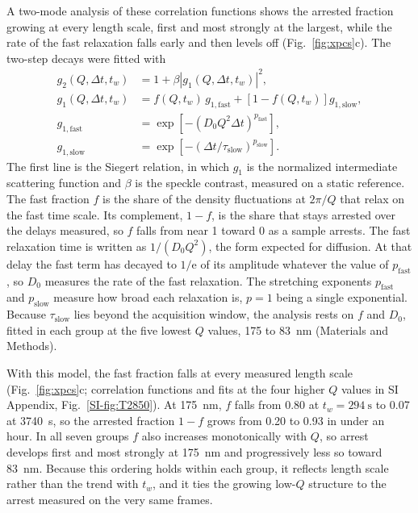 \documentclass[journal=nalefd,manuscript=letter,layout=traditional]{achemso}
\begin{document}
A two-mode analysis of these correlation functions shows the arrested fraction growing at every length scale, first and most strongly at the largest, while the rate of the fast relaxation falls early and then levels off (Fig.~\ref{fig:xpcs}c). The two-step decays were fitted with
\begin{equation}
\begin{aligned}
 g_2(Q,\Delta t,t_w)&=1+\beta\left|g_1(Q,\Delta t,t_w)\right|^{2},\\
 g_1(Q,\Delta t,t_w)&=f(Q,t_w)\,g_{1,\mathrm{fast}}+\left[1-f(Q,t_w)\right]g_{1,\mathrm{slow}},\\
 g_{1,\mathrm{fast}}&=\exp\!\left[-\left(D_0Q^{2}\Delta t\right)^{p_{\mathrm{fast}}}\right],\\
 g_{1,\mathrm{slow}}&=\exp\!\left[-\left(\Delta t/\tau_{\mathrm{slow}}\right)^{p_{\mathrm{slow}}}\right].
\end{aligned}
 \label{eq:twomode}
\end{equation}
The first line is the Siegert relation, in which $g_1$ is the normalized intermediate scattering function and $\beta$ is the speckle contrast, measured on a static reference. The fast fraction $f$ is the share of the density fluctuations at $2\pi/Q$ that relax on the fast time scale. Its complement, $1-f$, is the share that stays arrested over the delays measured, so $f$ falls from near 1 toward 0 as a sample arrests. The fast relaxation time is written as $1/(D_0Q^2)$, the form expected for diffusion. At that delay the fast term has decayed to $1/\mathrm{e}$ of its amplitude whatever the value of $p_{\mathrm{fast}}$, so $D_0$ measures the rate of the fast relaxation. The stretching exponents $p_{\mathrm{fast}}$ and $p_{\mathrm{slow}}$ measure how broad each relaxation is, $p=1$ being a single exponential. Because $\tau_{\mathrm{slow}}$ lies beyond the acquisition window, the analysis rests on $f$ and $D_0$, fitted in each group at the five lowest $Q$ values, 175 to \SI{83}{\nano\meter} (Materials and Methods).

With this model, the fast fraction falls at every measured length scale (Fig.~\ref{fig:xpcs}c; correlation functions and fits at the four higher $Q$ values in SI Appendix, Fig.~\ref*{SI-fig:T2850}). At \SI{175}{\nano\meter}, $f$ falls from 0.80 at $t_w=\SI{294}{\second}$ to 0.07 at \SI{3740}{\second}, so the arrested fraction $1-f$ grows from 0.20 to 0.93 in under an hour. In all seven groups $f$ also increases monotonically with $Q$, so arrest develops first and most strongly at \SI{175}{\nano\meter} and progressively less so toward \SI{83}{\nano\meter}. Because this ordering holds within each group, it reflects length scale rather than the trend with $t_w$, and it ties the growing low-$Q$ structure to the arrest measured on the very same frames.
\end{document}
